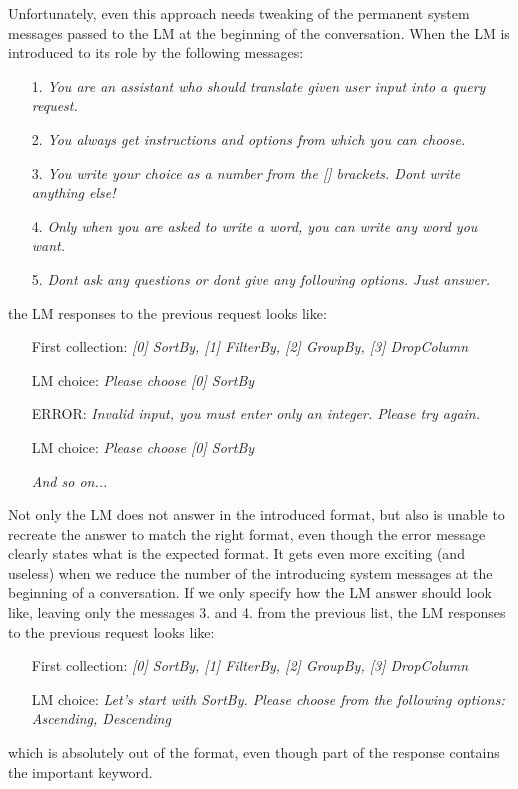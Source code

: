 \documentclass[11pt]{article}
\begin{document}
Unfortunately, even this approach needs tweaking of the permanent system messages passed to the LM at the beginning of the conversation. When the LM is introduced to its role by the following messages:
\begin{enumerate}
    \item[1.] \textit{You are an assistant who should translate given user input into a query request.}
    \item[2.] \textit{You always get instructions and options from which you can choose.}
    \item[3.] \textit{You write your choice as a number from the [] brackets. Dont write anything else!} 
    \item[4.] \textit{Only when you are asked to write a word, you can write any word you want.}
    \item[5.] \textit{Dont ask any questions or dont give any following options. Just answer.} 
\end{enumerate} the LM responses to the previous request looks like:
\begin{enumerate}
    \item[First collection:]\textit{[0] SortBy, [1] FilterBy, [2] GroupBy, [3] DropColumn}
    \item[LM choice:]\textit{Please choose [0] SortBy}
    \item[ERROR:]\textit{Invalid input, you must enter only an integer. Please try again.}
    \item[LM choice:]\textit{Please choose [0] SortBy}
    \item[] \textit{And so on...}  
\end{enumerate}

Not only the LM does not answer in the introduced format, but also is unable to recreate the answer to match the right format, even though the error message clearly states what is the expected format. It gets even more exciting (and useless) when we reduce the number of the introducing system messages at the beginning of a conversation. If we only specify how the LM answer should look like, leaving only the messages 3. and 4. from the previous list, the LM responses to the previous request looks like:

\begin{enumerate}
    \item[First collection:]\textit{[0] SortBy, [1] FilterBy, [2] GroupBy, [3] DropColumn}
    \item[LM choice:]\textit{Let's start with SortBy. Please choose from the following options: 
    \newline
    [0] Ascending,
    \newline
    [1] Descending}
\end{enumerate}
which is absolutely out of the format, even though part of the response contains the important keyword.
\end{document}
